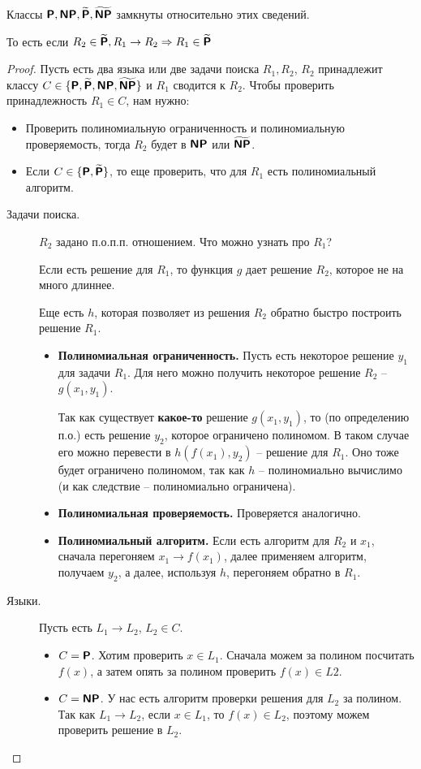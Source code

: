 \begin{thm}
	Классы $\P, \NP, \tP, \tNP$ замкнуты относительно этих сведений.
	
	То есть если $R_2 \in \tP, R_1 \to R_2 \Rightarrow R_1 \in \tP$
\end{thm}
\begin{proof}
		Пусть есть два языка или две задачи поиска $ R_1, R_2$, $ R_2$ принадлежит классу $ C \in \{\P, \tP, \NP, \tNP\}$ и $ R_1$ сводится к $ R_2$. Чтобы проверить принадлежность $ R_1 \in C$, нам нужно:
	\begin{itemize}[noitemsep]
		\item Проверить полиномиальную ограниченность и полиномиальную проверяемость, тогда $ R_2$ будет в $ \NP$ или $ \tNP$.
		\item Если $ C \in \{\P, \tP\}$, то еще проверить, что для $ R_1$ есть полиномиальный алгоритм.
	\end{itemize}
	\begin{description}
		\item[Задачи поиска.] 
			$R_2$ задано п.о.п.п. отношением.
			Что можно узнать про $ R_1$? 

			Если есть решение для $ R_1$, то функция $ g$ дает решение $ R_2$, которое не на много длиннее.

			Еще есть $ h$, которая позволяет из решения $ R_2$ обратно быстро построить решение $ R_1$.
			\begin{itemize}
				\item \textbf{Полиномиальная ограниченность.} Пусть есть некоторое решение $ y_1$ для задачи $ R_1$. Для него можно получить некоторое решение $ R_2$ -- $ g(x_1, y_1)$.

			Так как существует \textbf{какое-то} решение $ g(x_1, y_1)$, то (по определению п.о.) есть решение $ y_2$, которое ограничено полиномом. В таком случае его можно перевести в $ h(f(x_1), y_2)$ -- решение для $ R_1$.
			Оно тоже будет ограничено полиномом, так как $ h$ -- полиномиально вычислимо (и как следствие -- полиномиально ограничена).

			    \item \textbf{Полиномиальная проверяемость.}  Проверяется аналогично.
				\item \textbf{Полиномиальный алгоритм.} Если есть алгоритм для $ R_2$ и $ x_1$, сначала перегоняем $ x_1 \to  f(x_1)$, далее применяем алгоритм, получаем $ y_2$, а далее, используя $ h$, перегоняем обратно в $ R_1$.
			\end{itemize}
		\item[Языки.] 
            Пусть есть $L_1 \to L_2$, $L_2 \in C$. 
            \begin{itemize}
                \item $C = \P$. Хотим проверить $x \in L_1$. Сначала можем за полином посчитать $f(x)$, а затем опять за полином проверить $f(x) \in L2$. 
                \item $C = \NP$. У нас есть алгоритм проверки решения для $L_2$ за полином. Так как $L_1 \to L_2$, если $x \in L_1$, то $f(x) \in L_2$, поэтому можем проверить решение в $L_2$.
            \end{itemize}
	\end{description}
\end{proof}
